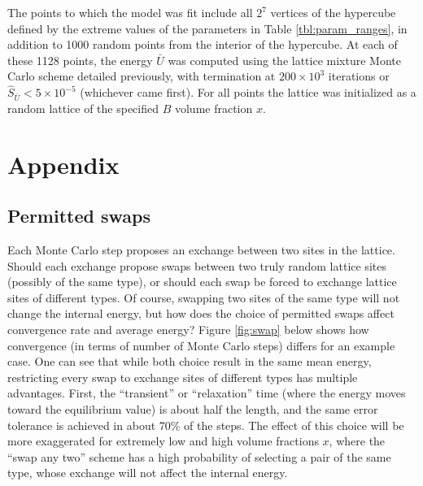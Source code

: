 \documentclass[10pt]{article}
\begin{document}
The points to which the model was fit include all $2^7$ vertices of the hypercube defined by the extreme values of the parameters in Table \ref{tbl:param_ranges}, in addition to 1000 random points from the interior of the hypercube.
At each of these 1128 points, the energy $\bar{U}$ was computed using the lattice mixture Monte Carlo scheme detailed previously, with termination at $200 \times 10^3$ iterations or $\hat{S}_{\bar{U}} < 5 \times 10^{-5}$ (whichever came first).
For all points the lattice was initialized as a random lattice of the specified $B$ volume fraction $x$.

\newpage
\section{Appendix}
\subsection{Permitted swaps}
Each Monte Carlo step proposes an exchange between two sites in the lattice.
Should each exchange propose swaps between two truly random lattice sites (possibly of the same type), or should each swap be forced to exchange lattice sites of different types.
Of course, swapping two sites of the same type will not change the internal energy, but how does the choice of permitted swaps affect convergence rate and average energy?
Figure \ref{fig:swap} below shows how convergence (in terms of number of Monte Carlo steps) differs for an example case. One can see that while both choice result in the same mean energy, restricting every swap to exchange sites of different types has multiple advantages.
First, the ``transient'' or ``relaxation'' time (where the energy moves toward the equilibrium value) is about half the length, and the same error tolerance is achieved in about 70\% of the steps.
The effect of this choice will be more exaggerated for extremely low and  high volume fractions $x$, where the ``swap any two'' scheme has a high probability of selecting a pair of the same type, whose exchange will not affect the internal energy.
\end{document}

